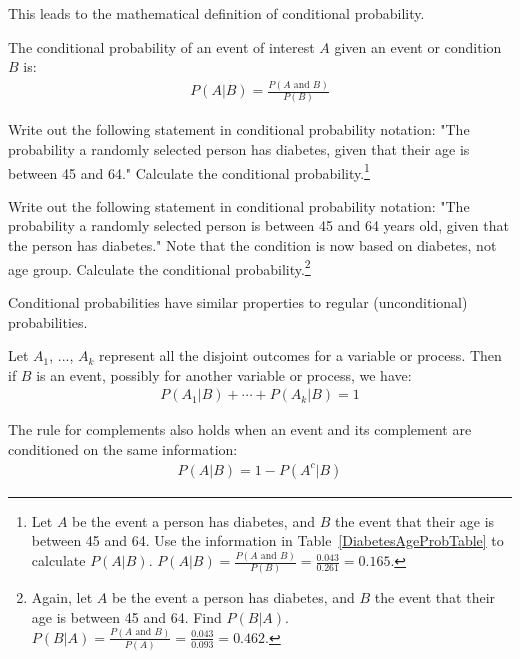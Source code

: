 This leads to the mathematical definition of conditional probability.

\begin{termBox}{
The conditional probability of an event of interest $A$ given an event or condition $B$ is:
\begin{align}
P(A | B) = \frac{P(A\text{ and }B)}{P(B)}
\label{condProbEq}
\end{align}}
\end{termBox}

\begin{exercise}
Write out the following statement in conditional probability notation: "The probability a randomly selected person has diabetes, given that their age is between 45 and 64." Calculate the conditional probability.\footnote{Let $A$ be the event a person has diabetes, and $B$ the event that their age is between 45 and 64. Use the information in Table~\ref{DiabetesAgeProbTable} to calculate $P(A|B)$. $P(A|B) = \frac{P(A\text{ and }B)}{P(B)} = \frac{0.043}{0.261} = 0.165.$}
\end{exercise}

\begin{exercise}
Write out the following statement in conditional probability notation: "The probability a randomly selected person is between 45 and 64 years old, given that the person has diabetes." Note that the condition is now based on diabetes, not age group. Calculate the conditional probability.\footnote{Again, let $A$ be the event a person has diabetes, and $B$ the event that their age is between 45 and 64. Find $P(B|A)$. $P(B|A) = \frac{P(A\text{ and }B)}{P(A)} = \frac{0.043}{0.093} = 0.462.$}	
\end{exercise}


Conditional probabilities have similar properties to regular (unconditional) probabilities.

\begin{termBox}{
Let $A_1$, ..., $A_k$ represent all the disjoint outcomes for a variable or process. Then if $B$ is an event, possibly for another variable or process, we have: \vspace{-1mm}
\begin{align*}
P(A_1|B)+\cdots+P(A_k|B) = 1
\end{align*}\vspace{-5.5mm} \par
The rule for complements also holds when an event and its complement are conditioned on the same information: \vspace{-1.5mm}
\begin{align*}
P(A | B) = 1 - P(A^c | B)
\end{align*}}
\end{termBox}



